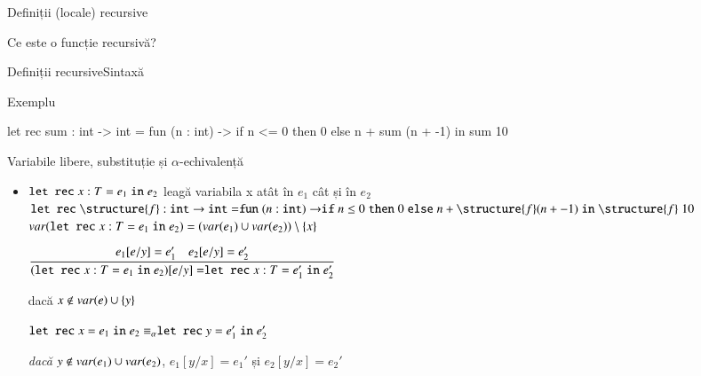 \documentclass[xcolor=pdftex,romanian,colorlinks]{beamer}
\begin{document}
\begin{section}{Definiții (locale) recursive}
\begin{frame}{Ce este o funcție recursivă?}


\end{frame}


\begin{frame}[fragile]{Definiții recursive}{Sintaxă}

\vfill
\begin{block}{Exemplu}
\begin{asciiml}
let rec sum : int -> int = 
  fun (n : int) ->
    if n <= 0 
    then 0 
    else n + sum (n + -1)
in sum 10 
\end{asciiml}
\end{block}
\end{frame}

\begin{frame}{Variabile libere, substituție și $\alpha$-echivalență}
\begin{itemize}
\item $\mathrel{\text{\ttfamily let rec}} x : T = e_1 \mathrel{\text{\ttfamily in}} e_2$ leagă variabila x atât în $e_1$ cât și în $e_2$
{\small
\(\Sletrec \structure{f} : {\Sint} \rightarrow {\Sint} = \Sfun (n:{\Sint})\rightarrow \Sif n \leq 0 \Sthen 0 \Selse n + \structure{f} (n + -1) \Sin \structure{f}\; 10\) 
}
\vitem $\mathop{var}(\mathrel{\text{\ttfamily let rec}} x : T = e_1 \mathrel{\text{\ttfamily in}} e_2) = (\mathop{var}(e_1) \cup \mathop{var}(e_2)) \setminus \{x\}$

\vitem $\displaystyle\reg{(\Sletrec x : T = e_1 \Sin e_2)[e/y] = \Sletrec x : T = e_1' \Sin e_2'}{e_1[e/y] = e_1' \si e_2[e/y] = e_2'}{}$

\hfill dacă ${x\not\in \mathop{var}(e)\cup \{ y\}}$

\vitem $\mathrel{\text{\ttfamily let rec}} x = e_1 \mathrel{\text{\ttfamily in}} e_2 \equiv_\alpha \mathrel{\text{\ttfamily let rec}} y = e_1' \mathrel{\text{\ttfamily in}} e_2'$

 \hfill {\it dacă} $y\not\in \mathop{var}(e_1)\cup \mathop{var}(e_2)$, $e_1[y/x] = e_1'$ și $e_2[y/x] = e_2'$ 
 

\end{itemize}
\end{frame}
\end{section}
\end{document}

